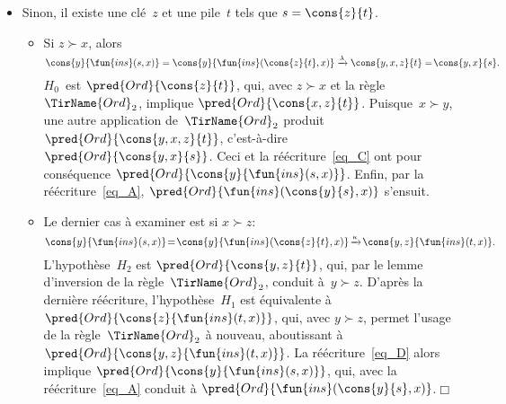 \begin{itemize}
\begin{itemize}
\begin{itemize}
      \item Sinon, il existe une clé~\(z\) et une pile~\(t\) tels que
        \(s = \cons{z}{t}\).
        \begin{itemize}

          \item Si \(z \succ x\), alors
            \begin{equation}
              \cons{y}{\fun{ins}(s,x)} =
              \cons{y}{\fun{ins}(\cons{z}{t},x)}
              \xrightarrow{\smash{\lambda}} \cons{y,x,z}{t} =\!
              \cons{y,x}{s}.\!\!\!\label{eq_C}
            \end{equation}
            \(H_0\)~est \(\pred{Ord}{\cons{z}{t}}\), qui, avec \(z
            \succ x\) et la règle \(\TirName{Ord}_2\), implique
            \(\pred{Ord}{\cons{x,z}{t}}\). Puisque~\(x \succ y\), une
            autre application de~\(\TirName{Ord}_2\) produit
            \(\pred{Ord}{\cons{y,x,z}{t}}\), c'est-à-dire
            \(\pred{Ord}{\cons{y,x}{s}}\). Ceci et la
            réécriture~\eqref{eq_C} ont pour conséquence
            \(\pred{Ord}{\cons{y}{\fun{ins}(s,x)}}\).
            Enfin, par la réécriture~\eqref{eq_A},
            \(\pred{Ord}{\fun{ins}(\cons{y}{s},x)}\) s'ensuit.

          \item Le dernier cas à examiner est si \(x \succ z\):
            \begin{equation}
              \cons{y}{\fun{ins}(s,x)} \!=\!
              \cons{y}{\fun{ins}(\cons{z}{t},x)}
              \!\xrightarrow{\smash{\kappa}}\!
              \cons{y,z}{\fun{ins}(t,x)}.\label{eq_D}
            \end{equation}
            L'hypothèse~\(H_2\) est \(\pred{Ord}{\cons{y,z}{t}}\),
            qui, par le lemme d'inversion de la
            règle~\(\TirName{Ord}_2\), conduit à~\(y \succ z\). D'après
            la dernière réécriture, l'hypothèse~\(H_1\) est équivalente à
            \(\pred{Ord}{\cons{z}{\fun{ins}(t,x)}}\), qui, avec \(y
            \succ z\), permet l'usage de la règle~\(\TirName{Ord}_2\)
            à nouveau, aboutissant à
            \(\pred{Ord}{\cons{y,z}{\fun{ins}(t,x)}}\).
            La réécriture~\eqref{eq_D} alors implique
            \(\pred{Ord}{\cons{y}{\fun{ins}(s,x)}}\), qui, avec
            la réécriture~\eqref{eq_A} conduit à
 \(\pred{Ord}{\fun{ins}(\cons{y}{s},x)}\).\hfill\(\Box\)
      \end{itemize}
    \end{itemize}
  \end{itemize}
\end{itemize}

